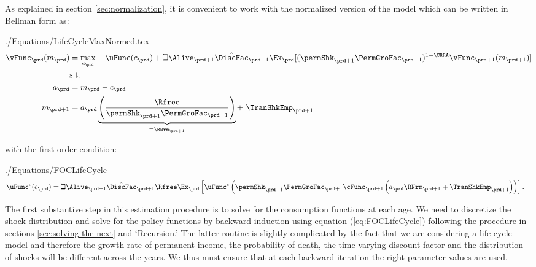 \documentclass[\econtexRoot/SolvingMicroDSOPs]{subfiles}
\begin{document}
As explained in section \ref{sec:normalization}, it is convenient to work with the normalized version of the model which can be written in Bellman form as:
\begin{verbatimwrite}{./Equations/LifeCycleMaxNormed.tex}
  \begin{equation*}\begin{gathered}\begin{aligned}
        \vFunc_{\prd}(m_{\prd})  & = \max_{{c}_{\prd}}~~~ \uFunc(c_{\prd})+\beth\Alive_{\prd+1}\hat{\DiscFac}_{\prd+1}
        \Ex_{\prd}[(\permShk_{\prd+1}\PermGroFac_{\prd+1})^{1-\CRRA}\vFunc_{\prd+1}(m_{\prd+1})]   \\
        & \text{s.t.}   \nonumber \\
        a_{\prd}    & = m_{\prd}-c_{\prd} \nonumber
        \\      m_{\prd+1}  & = a_{\prd}\underbrace{\left(\frac{\Rfree}{\permShk_{\prd+1}\PermGroFac_{\prd+1}}\right)}_{\equiv \RNrm_{\prd+1}}+ ~\TranShkEmp_{\prd+1}
      \end{aligned}\end{gathered}\end{equation*}
\end{verbatimwrite} 
\unskip
with the first order condition:
\begin{verbatimwrite}{./Equations/FOCLifeCycle}
  \begin{equation}\begin{gathered}\begin{aligned}
        \uFunc^{c}(c_{\prd}) & = \beth\Alive_{\prd+1}\hat{\DiscFac}_{\prd+1}\Rfree \Ex_{\prd}\left[\uFunc^{c}\left(\permShk_{\prd+1}\PermGroFac_{\prd+1}\cFunc_{\prd+1}\left(a_{\prd}\RNrm_{\prd+1}+\TranShkEmp_{\prd+1}\right)\right)\right]\label{eq:FOCLifeCycle}
        .
      \end{aligned}\end{gathered}\end{equation}
\end{verbatimwrite}
 \unskip

The first substantive {step} in this estimation procedure is
to solve for the consumption functions at each age. We need to
discretize the shock distribution and solve for the policy
functions by backward induction using equation (\ref{eq:FOCLifeCycle})
following the procedure in sections \ref{sec:solving-the-next} and
`Recursion.' The latter routine
is slightly complicated by the fact that we are considering a
life-cycle model and therefore the growth rate of permanent income,
the probability of death, the time-varying discount factor and the
distribution of shocks will be different across the years. We thus
must ensure that at each backward iteration the right parameter
values are used.
\end{document}
